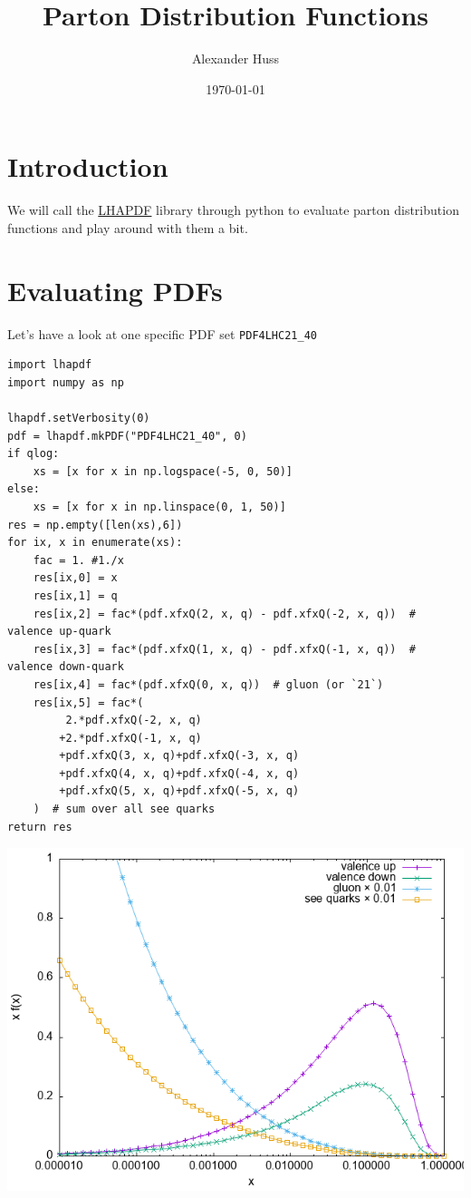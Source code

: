 \documentclass[11pt]{article}
\author{Alexander Huss}
\date{\today}
\title{Parton Distribution Functions}
\begin{document}
\maketitle
\tableofcontents



\section{Introduction}
\label{sec:orga02b098}
We will call the \href{https://lhapdf.hepforge.org/}{LHAPDF} library through python to evaluate parton distribution functions and play around with them a bit.

\section{Evaluating PDFs}
\label{sec:orga334cac}
Let's have a look at one specific PDF set \texttt{PDF4LHC21\_40}

\begin{verbatim}
import lhapdf
import numpy as np

lhapdf.setVerbosity(0)
pdf = lhapdf.mkPDF("PDF4LHC21_40", 0)
if qlog:
    xs = [x for x in np.logspace(-5, 0, 50)]
else:
    xs = [x for x in np.linspace(0, 1, 50)]
res = np.empty([len(xs),6])
for ix, x in enumerate(xs):
    fac = 1. #1./x
    res[ix,0] = x
    res[ix,1] = q
    res[ix,2] = fac*(pdf.xfxQ(2, x, q) - pdf.xfxQ(-2, x, q))  # valence up-quark
    res[ix,3] = fac*(pdf.xfxQ(1, x, q) - pdf.xfxQ(-1, x, q))  # valence down-quark
    res[ix,4] = fac*(pdf.xfxQ(0, x, q))  # gluon (or `21`)
    res[ix,5] = fac*(
         2.*pdf.xfxQ(-2, x, q)
        +2.*pdf.xfxQ(-1, x, q)
        +pdf.xfxQ(3, x, q)+pdf.xfxQ(-3, x, q)
        +pdf.xfxQ(4, x, q)+pdf.xfxQ(-4, x, q)
        +pdf.xfxQ(5, x, q)+pdf.xfxQ(-5, x, q)
    )  # sum over all see quarks
return res
\end{verbatim}

\begin{center}
\includegraphics[width=.9\linewidth]{pdf_xfx.png}
\end{center}
\end{document}
